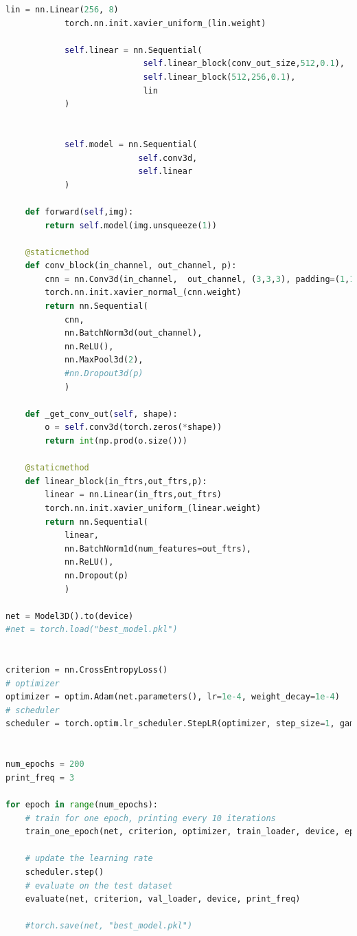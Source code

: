 \documentclass[10pt, twocolumn, letterpaper]{article}
\begin{document}
\begin{lstlisting}[language=Python]
            lin = nn.Linear(256, 8)
            torch.nn.init.xavier_uniform_(lin.weight)

            self.linear = nn.Sequential(
                            self.linear_block(conv_out_size,512,0.1),
                            self.linear_block(512,256,0.1),
                            lin
            ) 
            
            
            self.model = nn.Sequential(                                    
                           self.conv3d,
                           self.linear            
            )

    def forward(self,img):
        return self.model(img.unsqueeze(1))  

    @staticmethod
    def conv_block(in_channel, out_channel, p):
        cnn = nn.Conv3d(in_channel,  out_channel, (3,3,3), padding=(1,1,1))
        torch.nn.init.xavier_normal_(cnn.weight)
        return nn.Sequential(
            cnn,
            nn.BatchNorm3d(out_channel),
            nn.ReLU(),
            nn.MaxPool3d(2),
            #nn.Dropout3d(p)
            )
    
    def _get_conv_out(self, shape):
        o = self.conv3d(torch.zeros(*shape))
        return int(np.prod(o.size())) 

    @staticmethod
    def linear_block(in_ftrs,out_ftrs,p):
        linear = nn.Linear(in_ftrs,out_ftrs)
        torch.nn.init.xavier_uniform_(linear.weight)
        return nn.Sequential(
            linear,
            nn.BatchNorm1d(num_features=out_ftrs),
            nn.ReLU(),
            nn.Dropout(p)
            )

net = Model3D().to(device)
#net = torch.load("best_model.pkl")


criterion = nn.CrossEntropyLoss()
# optimizer
optimizer = optim.Adam(net.parameters(), lr=1e-4, weight_decay=1e-4)
# scheduler
scheduler = torch.optim.lr_scheduler.StepLR(optimizer, step_size=1, gamma = 0.8)


num_epochs = 200
print_freq = 3

for epoch in range(num_epochs):
    # train for one epoch, printing every 10 iterations
    train_one_epoch(net, criterion, optimizer, train_loader, device, epoch, print_freq, apex=False)
    
    # update the learning rate
    scheduler.step()
    # evaluate on the test dataset
    evaluate(net, criterion, val_loader, device, print_freq)

    #torch.save(net, "best_model.pkl")


\end{lstlisting}
\end{document}
